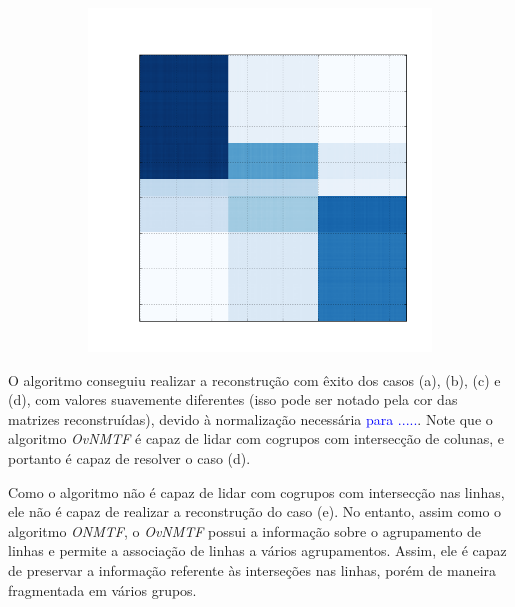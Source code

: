\documentclass[
    12pt,                %
    oneside,            %
    a4paper,            %
    english,            %
    brazil                %
    ]{abntex2ppgsi}
\begin{document}
\begin{figure}[H]
\begin{subfigure}[b]{0.18\textwidth}
        \caption{}
    \end{subfigure}
    \begin{subfigure}[b]{0.18\textwidth}
        \includegraphics[width=\textwidth]{img/e-reconstruction-ovnmtf.png}
        \caption{}
    \end{subfigure}
    \label{fig:reconstruction:ovnmtf}
\end{figure}

O algoritmo conseguiu realizar a reconstrução com êxito dos casos (a), (b), (c) e (d), com valores suavemente diferentes (isso pode ser notado pela cor das matrizes reconstruídas), devido à normalização necessária \textcolor{blue}{para .....}. Note que o algoritmo \textit{OvNMTF} é capaz de lidar com cogrupos com intersecção de colunas, e portanto é capaz de resolver o caso (d).

Como o algoritmo não é capaz de lidar com cogrupos com intersecção nas linhas, ele não é capaz de realizar a reconstrução do caso (e). No entanto, assim como o algoritmo \textit{ONMTF}, o \textit{OvNMTF} possui a informação sobre o agrupamento de linhas e permite a associação de linhas a vários agrupamentos. Assim, ele é capaz de preservar a informação referente às interseções nas linhas, porém de maneira fragmentada em vários grupos.
\end{document}
